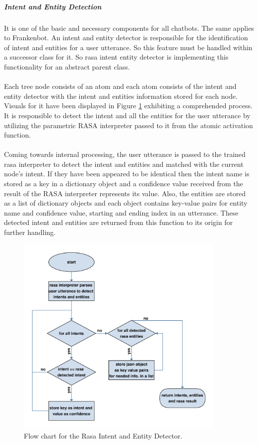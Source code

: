 \subparagraph*{Intent and Entity Detection}
It is one of the basic and necessary components for all chatbots. The same applies to Frankenbot. An intent and entity detector is responsible for the identification of intent and entities for a user utterance. So this feature must be handled within a successor class for it. So rasa intent entity detector is implementing this functionality for an abstract parent class.
\\~\\
Each tree node consists of an atom and each atom consists of the intent and entity detector with the intent and entities information stored for each node. Visuals for it have been displayed in Figure \ref{fig:flowIntandEnt} exhibiting a comprehended process. It is responsible to detect the intent and all the entities for the user utterance by utilizing the parametric RASA interpreter passed to it from the atomic activation function.
\\~\\
Coming towards internal processing, the user utterance is passed to the trained rasa interpreter to detect the intent and entities and matched with the current node's intent. If they have been appeared to be identical then the intent name is stored as a key in a dictionary object and a confidence value received from the result of the RASA interpreter represents its value. Also, the entities are stored as a list of dictionary objects and each object contains key-value pairs for entity name and confidence value, starting and ending index in an utterance. These detected intent and entities are returned from this function to its origin for further handling.

\begin{figure}[!h]
    \centering
    \includegraphics[width=0.9\textwidth]{img/Intent_entity_detector.pdf}
    \caption{Flow chart for the Rasa Intent and Entity Detector.}
    \label{fig:flowIntandEnt}
\end{figure}

